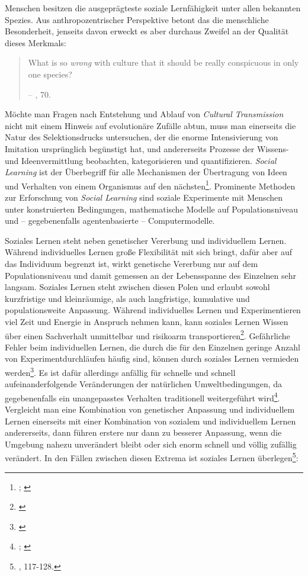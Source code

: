 \documentclass[openany,twoside,twocolumn]{book}
\let\rmarkdownfootnote\footnote%
\def\footnote{\protect\rmarkdownfootnote}
\begin{document}
Menschen besitzen die ausgeprägteste soziale Lernfähigkeit unter allen
bekannten Spezies. Aus anthropozentrischer Perspektive betont das die
menschliche Besonderheit, jenseits davon erweckt es aber durchaus
Zweifel an der Qualität dieses Merkmals:

\begin{quote}
What is so \emph{wrong} with culture that it should be really
conspicuous in only one species?

-- \textcite{smith_cultural_1992}, 70.
\end{quote}

Möchte man Fragen nach Entstehung und Ablauf von \emph{Cultural
Transmission} nicht mit einem Hinweis auf evolutionäre Zufälle abtun,
muss man einerseits die Natur des Selektionsdrucks untersuchen, der die
enorme Intensivierung von Imitation ursprünglich begünstigt hat, und
andererseits Prozesse der Wissens- und Ideenvermittlung beobachten,
kategorisieren und quantifizieren. \emph{Social Learning} ist der
Überbegriff für alle Mechanismen der Übertragung von Ideen und Verhalten
von einem Organismus auf den nächsten\footnote{\textcite{eerkens_cultural_2007};
  \textcite{rendell_cognitive_2011}}. Prominente Methoden zur
Erforschung von \emph{Social Learning} sind soziale Experimente mit
Menschen unter konstruierten Bedingungen, mathematische Modelle auf
Populationsniveau und -- gegebenenfalls agentenbasierte --
Computermodelle.

Soziales Lernen steht neben genetischer Vererbung und individuellem
Lernen. Während individuelles Lernen große Flexibilität mit sich bringt,
dafür aber auf das Individuum begrenzt ist, wirkt genetische Vererbung
nur auf dem Populationsniveau und damit gemessen an der Lebensspanne des
Einzelnen sehr langsam. Soziales Lernen steht zwischen diesen Polen und
erlaubt sowohl kurzfristige und kleinräumige, als auch langfristige,
kumulative und populationsweite Anpassung. Während individuelles Lernen
und Experimentieren viel Zeit und Energie in Anspruch nehmen kann, kann
soziales Lernen Wissen über einen Sachverhalt unmittelbar und risikoarm
transportieren\footnote{\textcite{rendell_rogers_2010}}. Gefährliche
Fehler beim individuellen Lernen, die durch die für den Einzelnen
geringe Anzahl von Experimentdurchläufen häufig sind, können durch
soziales Lernen vermieden werden\footnote{\textcite{boyd_evolution_1988}}.
Es ist dafür allerdings anfällig für schnelle und schnell
aufeinanderfolgende Veränderungen der natürlichen Umweltbedingungen, da
gegebenenfalls ein unangepasstes Verhalten traditionell weitergeführt
wird\footnote{\textcite{rogers_does_1988}; \textcite{spencer_human_1993}}.
Vergleicht man eine Kombination von genetischer Anpassung und
individuellem Lernen einerseits mit einer Kombination von sozialem und
individuellem Lernen andererseits, dann führen erstere nur dann zu
besserer Anpassung, wenn die Umgebung nahezu unverändert bleibt oder
sich enorm schnell und völlig zufällig verändert. In den Fällen zwischen
diesen Extrema ist soziales Lernen überlegen\footnote{\textcite{boyd_culture_1985},
  117-128.}:
\end{document}
